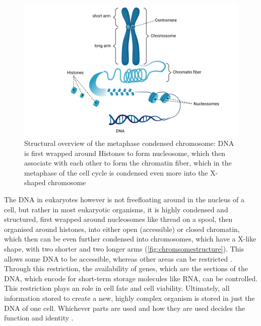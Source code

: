 \begin{figure}[!ht]
\centering
\includegraphics[width=0.9\linewidth]{Figures/intro/ChromosomeStructure}
\caption[Overview Chromosome structure]{Structural overview of the metaphase condensed chromosome: DNA is first wrapped around Histones to form nucleosome, which then associate with each other to form the chromatin fiber, which in the metaphase of the cell cycle is condensed even more into the X-shaped chromosome}\label{fig:chromsomestructure}
\end{figure}

The DNA in eukaryotes\add{,} however is not free\add{-}floating around in the nucleus of a cell, but rather in most eukaryotic organisms, it is highly condensed and structured, first wrapped around nucleosomes like thread on a spool, then organised around histones, into either open (accessible) or closed chromatin, which then can be even further condensed into chromosomes, which have a X-like shape, with two shorter and two longer arms (\autoref{fig:chromsomestructure}). This  allows some DNA to be accessible, whereas other areas can be restricted \cite{Hammond2017}. Through this restriction, the availability of  genes, which are the sections of the DNA, which encode for short-term storage molecules like RNA, can be controlled. This restriction plays an  role in cell fate and cell viability. Ultimately, all information stored to create a new, highly complex organism is stored in just the DNA of one cell. Whichever parts are used and how they are used decides the  function and  identity  \cite{Bonev2016}. 


